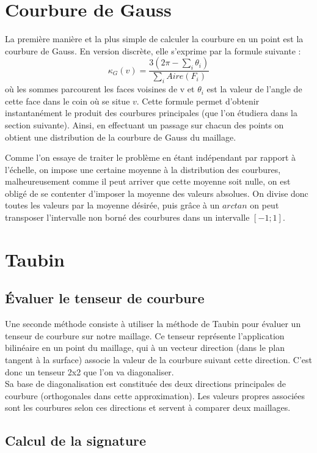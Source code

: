 \documentclass{llncs}
\begin{document}
\section{Courbure de Gauss}

La première manière et la plus simple de calculer la courbure en un point est la courbure de Gauss. En version discrète, elle s'exprime par la formule suivante :
\[ \kappa_G(v) = \frac{3(2\pi-\sum_{i}\theta_{i})}{\sum_{i}  Aire(F_{i})} \]
où les sommes parcourent les faces voisines de v et $ \theta_{i} $ est la valeur de l'angle de cette face dans le coin où se situe $ v $.
Cette formule permet d'obtenir instantanément le produit des courbures principales (que l'on étudiera dans la section suivante). Ainsi, en effectuant un passage sur chacun des points on obtient une distribution de la courbure de Gauss du maillage. 

Comme l'on essaye de traiter le problème en étant indépendant par rapport à l'échelle, on impose une certaine moyenne à la distribution des courbures, malheureusement comme il peut arriver que cette moyenne soit nulle, on est obligé de se contenter d'imposer la moyenne des valeurs absolues. On divise donc toutes les valeurs par la moyenne désirée, puis grâce à un $ arctan $ on peut transposer l'intervalle non borné des courbures dans un intervalle $ \left[ -1 ; 1 \right] $.

\section{Taubin}

\subsection{\'Evaluer le tenseur de courbure}
Une seconde méthode consiste à utiliser la méthode de Taubin pour évaluer un tenseur de courbure sur notre maillage. Ce tenseur représente l'application bilinéaire en un point du maillage, qui à un vecteur direction (dans le plan tangent à la surface) associe la valeur de la courbure suivant cette direction. C'est donc un tenseur 2x2 que l'on va diagonaliser.
\\
Sa base de diagonalisation est constituée des deux directions principales de courbure (orthogonales dans cette approximation). Les valeurs propres associées sont les courbures selon ces directions et servent à comparer deux maillages.


\subsection{Calcul de la signature}
\end{document}
